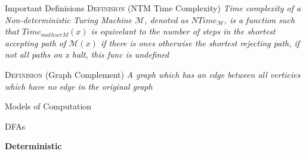 \documentclass[12pt, letterpaper]{article}
\begin{document}
\begin{section}{Important Definisions}
  \textsc{Definision} (NTM Time Complexity) \textit{Time complexity
    of a Non-deterministic Turing Machine \(\mathscr{M}\), denoted as \(NTime_{\mathscr{M}}\),
    is a function such that \(Time_{mathscr{M}}(x)\) is equivelant to the
    number of steps in the shortest accepting path of \(\mathscr{M}(x)\) if there is ones
    otherwise the shortest rejecting path, if not all paths on x halt, this func is undefined}

  \textsc{Definision} (Graph Complement) \textit{A graph which has an edge
    between all verticies which have no edge in the original graph}

\end{section}

\begin{section}{Models of Computation}

  \begin{subsection}{DFAs}

    \textbf{Deterministic }

  \end{subsection}

\end{section}
\end{document}
